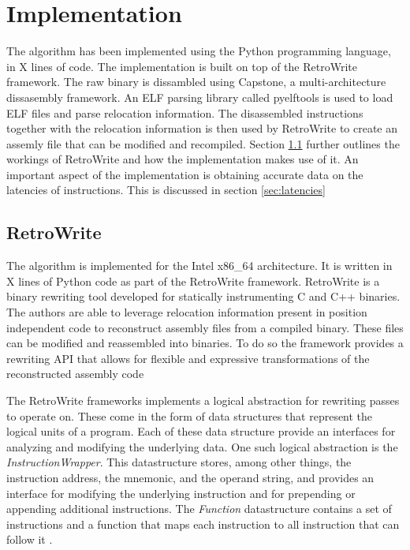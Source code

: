 \chapter{Implementation}
\label{cha:implementation}
The algorithm has been implemented using the Python programming language, in X lines of code. The implementation is built on top of the RetroWrite framework. 
The raw binary is dissambled using Capstone, a multi-architecture dissasembly framework. An ELF parsing library called pyelftools is used to load ELF files and parse relocation information. 
The disassembled instructions together with the relocation information is then used by RetroWrite to create an assemly file that can be modified and recompiled. 
Section \ref{sec:retrowrite} further outlines the workings of RetroWrite and how the implementation makes use of it. 
An important aspect of the implementation is obtaining accurate data on the latencies of instructions. 
This is discussed in section  \ref{sec:latencies}


\section{RetroWrite}
\label{sec:retrowrite}
The algorithm is implemented for the Intel x86\_64 architecture. It is written in X lines of Python code as part of the RetroWrite framework. 
RetroWrite is a binary rewriting tool developed for statically instrumenting C and C++ binaries. 
The authors are able to leverage relocation information present in position independent code to reconstruct assembly files from a compiled binary. 
These files can be modified and reassembled into binaries. 
To do so the framework provides a rewriting API that allows for flexible and expressive transformations of the reconstructed assembly code \cite{Dinesh2020RetroWriteSI}

The RetroWrite frameworks implements a logical abstraction for rewriting passes to operate on.
These come in the form of data structures that represent the logical units of a program.
Each of these data structure provide an interfaces for analyzing and modifying the underlying data. 
One such logical abstraction is the \textit{InstructionWrapper}. 
This datastructure stores, among other things, the instruction address, the mnemonic, and the operand string, and provides an interface
for modifying the underlying instruction and for prepending or appending additional instructions.  
The \textit{Function} datastructure contains a set of instructions and a function that maps each instruction to all instruction that can follow it \cite{Dinesh2020RetroWriteSI,  hexhive}. 

